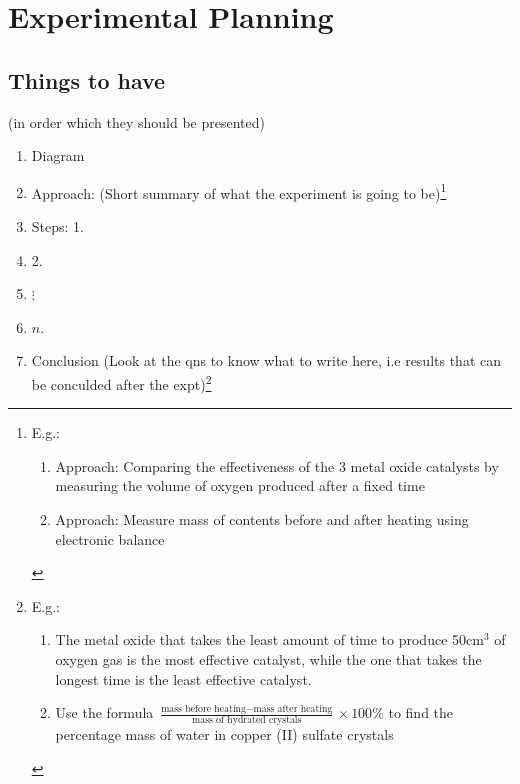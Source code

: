 \documentclass[oneside]{book}
\begin{document}
\newpage

\chapter{Experimental Planning}
\section{Things to have}\small 
(in order which they should be presented)
\begin{enumerate}
    \item Diagram 
    \item Approach: \small (Short summary of what the experiment is going to be)\footnote{E.g.: \scriptsize \begin{enumerate}
        \item Approach: Comparing the effectiveness of the 3 metal oxide catalysts by measuring the volume of oxygen produced after a fixed time 
        \item Approach: Measure mass of contents before and after heating using electronic balance
    \end{enumerate}}
    \item Steps: 1.
    \item 2.
    \item \(\vdots\)
    \item \(n.\)
    \item Conclusion \footnotesize (Look at the qns to know what to write here, i.e results that can be conculded after the expt)\footnote{E.g.:\scriptsize \begin{enumerate}
        \item The metal oxide that takes the least amount of time to produce 50cm\(^3\) of oxygen gas is the most effective catalyst, while the one that takes the longest time is the least effective catalyst.
        \item Use the formula \(\frac{\text{mass before heating}-\text{mass after heating}}{\text{mass of hydrated crystals}} \times 100 \% \) to find the percentage mass of water in copper (II) sulfate crystals
    \end{enumerate}}
\end{enumerate}
\end{document}
